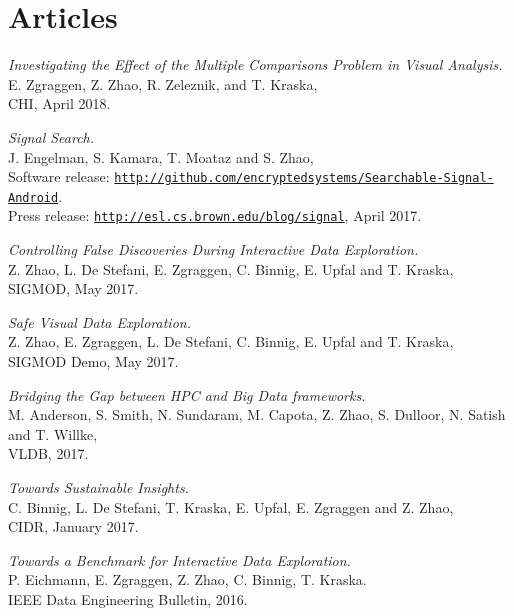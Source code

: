 \documentclass[letterpaper]{article}
\renewenvironment{itemize}{
  \begin{list}{}{
    \setlength{\leftmargin}{1.5em}
  }
}{
  \end{list}
}
\begin{document}
\section*{Articles}

\begin{itemize}

\item \textit{Investigating the Effect of the Multiple Comparisons Problem in Visual Analysis.} \\
  E. Zgraggen, Z. Zhao, R. Zeleznik, and T. Kraska, \\
  CHI, April 2018.

\item \textit{Signal Search.} \\
  J. Engelman, S. Kamara, T. Moataz and S. Zhao, \\
  Software release: \href{http://github.com/encryptedsystems/Searchable-Signal-Android}{\tt http://github.com/encryptedsystems/Searchable-Signal-Android}. \\
  Press release: \href{http://esl.cs.brown.edu/blog/signal}{\tt http://esl.cs.brown.edu/blog/signal}, April 2017.

\item \textit{Controlling False Discoveries During Interactive Data Exploration.} \\
  Z. Zhao, L. De Stefani, E. Zgraggen, C. Binnig, E. Upfal and T. Kraska, \\
  SIGMOD, May 2017.

\item \textit{Safe Visual Data Exploration.} \\
  Z. Zhao, E. Zgraggen, L. De Stefani, C. Binnig, E. Upfal and T. Kraska, \\
  SIGMOD Demo, May 2017.

\item \textit{Bridging the Gap between HPC and Big Data frameworks.} \\
  M. Anderson, S. Smith, N. Sundaram, M. Capota, Z. Zhao, S. Dulloor, N. Satish and T. Willke, \\
  VLDB, 2017.

\item \textit{Towards Sustainable Insights.} \\
  C. Binnig, L. De Stefani, T. Kraska, E. Upfal, E. Zgraggen and Z. Zhao, \\
  CIDR, January 2017.

\item \textit{Towards a Benchmark for Interactive Data Exploration.} \\
  P. Eichmann, E. Zgraggen, Z. Zhao, C. Binnig, T. Kraska. \\
   IEEE Data Engineering Bulletin, 2016.


\end{itemize}
\end{document}
